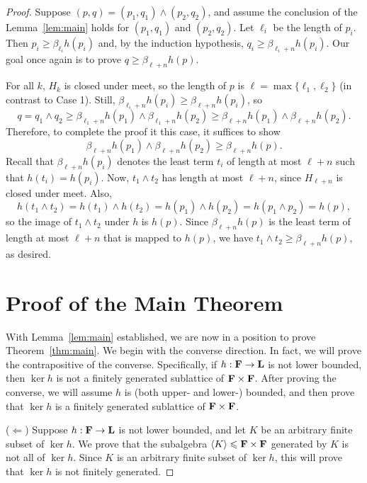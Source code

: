 \begin{proof}
\medskip

 Suppose $(p, q) = (p_1, q_1) \wedge (p_2, q_2)$,
and assume the conclusion of the Lemma~\ref{lem:main} holds 
for $(p_1, q_1)$ and $(p_2, q_2)$.
Let $\ell_i$ be the length of $p_i$.  Then
$p_i\geq \beta_{\ell_i}h(p_i)$ and, by the induction hypothesis,
$q_i\geq \beta_{\ell_i+n}h(p_i)$. Our goal once again is to prove
$q\geq \beta_{\ell+n}h(p)$.

For all $k$, $H_k$ is closed under meet, so 
the length of $p$ is 
$\ell = \max\{\ell_1, \ell_2\}$ (in contrast to Case 1).
Still, 
$\beta_{\ell_i+n}h(p_i) \geq \beta_{\ell+n}h(p_i)$, so
\[
q = q_1\wedge q_2\geq \beta_{\ell_1+n}h(p_1) \wedge \beta_{\ell_1+n}h(p_2)
\geq \beta_{\ell+n}h(p_1) \wedge \beta_{\ell+n}h(p_2).
\]
Therefore, to complete the proof it this case, it suffices to show
\[
\beta_{\ell+n}h(p_1) \wedge \beta_{\ell+n}h(p_2) \geq 
\beta_{\ell+n}h(p).
\]
Recall that $\beta_{\ell+n}h(p_i)$ denotes the least term $t_i$ 
of length at most $\ell +n$ such that $h(t_i) = h(p_i)$. 
Now, $t_1 \wedge t_2$ has length at most $\ell+n$, since $H_{\ell+n}$ is 
closed under meet. Also, 
\[
h(t_1\wedge t_2) = 
h(t_1) \wedge h(t_2) = 
h(p_1) \wedge h(p_2) = 
h(p_1 \wedge p_2) = h(p),
\] 
so the image of $t_1\wedge t_2$ under $h$ is $h(p)$.
Since $\beta_{\ell+n}h(p)$ is the least term of length at 
most $\ell+n$ that is mapped to $h(p)$, we have 
$t_1 \wedge t_2 \geq \beta_{\ell+n}h(p)$, as desired.

\section{Proof of the Main Theorem}
With Lemma~\ref{lem:main} established, we are now in a position to prove 
Theorem~\ref{thm:main}.  We begin with the converse direction.  
In fact, we will prove the contrapositive of the converse.
Specifically, if $h: \mathbf{F} \to \mathbf{L}$ is not lower bounded,
then $\ker h$ is not a finitely generated sublattice of 
$\mathbf{F} \times \mathbf{F}$.  After proving the converse, we will
assume $h$ is (both upper- and lower-) bounded, and then
prove that $\ker h$ is a finitely generated sublattice of 
$\mathbf{F} \times \mathbf{F}$. 

\medskip


  \noindent ($\Leftarrow$)
  Suppose $h: \mathbf{F} \to \mathbf{L}$ is not lower bounded, 
  and let $K$ be an arbitrary finite subset of $\ker h$.  We prove that the 
  subalgebra $\langle K\rangle\leqslant \mathbf{F} \times \mathbf{F}$ generated by $K$ is not 
  all of $\ker h$.
  Since $K$ is an arbitrary finite subset of $\ker h$, this will prove that 
  $\ker h$ is not finitely generated.


\end{proof}
